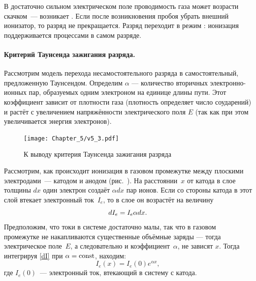 В достаточно сильном электрическом поле проводимость газа может возрасти
скачком~--- возникает .
Если после возникновения пробоя убрать внешний ионизатор, то разряд не
прекращается. Разряд переходит в режим :
ионизация поддерживается процессами в самом разряде.

\paragraph{Критерий Таунсенда зажигания разряда.}
Рассмотрим модель перехода несамостоятельного разряда в самостоятельный,
предложенную Таунсендом.
Определим  $\alpha$ ---
количество вторичных электронно-ионных пар, образуемых одним электроном
на единице длины пути.
Этот коэффициент зависит от плотности газа
(плотность определяет число соударений)
и растёт с увеличением напряжённости электрического поля $E$
(так как при этом увеличивается энергия электронов).

\begin{figure}[h!]
    \centering
    \texttt{[image: Chapter\_5/v5\_3.pdf]}
    \caption{К выводу критерия Таунсенда зажигания разряда}
\end{figure}

Рассмотрим, как происходит ионизация в газовом промежутке между плоскими
электродами~--- катодом и анодом (рис.~). На
расстоянии~$x$ от катода в слое толщины $dx$ один электрон создаёт $\alpha dx$
пар ионов. Если со стороны катода в этот
слой втекает электронный ток~$I_e$, то в слое он возрастёт на величину
\begin{equation*}
\eqmark{dI}
dI_e=I_e\alpha dx.
\end{equation*}
Предположим, что токи в системе достаточно малы, так что в газовом промежутке
не накапливаются существенные объёмные заряды --- тогда электрическое поле~$E$,
а следовательно и коэффициент~$\alpha$, не зависят $x$.
Тогда интегрируя \eqref{dI} при $\alpha=\mathrm{const}$, находим:
\begin{equation*}
	I_e(x)=I_e(0)e^{\alpha x},
\end{equation*}
где $I_e(0)$~--- электронный ток, втекающий в систему с катода.

